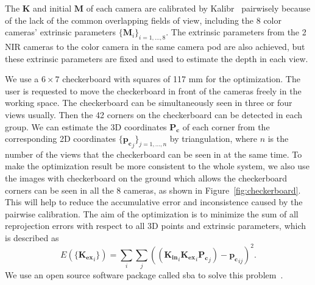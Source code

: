 The $\mathbf{K}$ and initial $\mathbf{M}$ of each camera are calibrated by Kalibr~\cite{Maye2013Self} pairwisely because of the lack of the common overlapping fields of view, including the 8 color cameras' extrinsic parameters $\{\mathbf{M}_{i}\}_{i=1,...,8}$. The extrinsic parameters from the 2 NIR cameras to the color camera in the same camera pod are also achieved, but these extrinsic parameters are fixed and used to estimate the depth in each view.


We use a $6\times7$ checkerboard with squares of 117 mm for the optimization. 
%
The user is requested to move the checkerboard in front of the cameras freely in the working space. The checkerboard can be simultaneously seen in three or four views usually. 
%
Then the 42 corners on the checkerboard can be detected in each group. 
%
We can estimate the 3D coordinates $\mathbf{P_{c}}$ of each corner from the corresponding 2D coordinates $\{\mathbf{p_{c}}_{j}\}_{j=1,...,n}$ by triangulation, where $n$ is the number of the views that the checkerboard can be seen in at the same time. 
To make the optimization result be more consistent to the whole system, we also use the images with checkerboard on the ground which allows the checkerboard corners can be seen in all the 8 cameras,  as shown in Figure~\ref{fig:checkerboard}. This will help to reduce the accumulative error and inconsistence caused by the pairwise calibration. 
The aim of the optimization is to minimize the sum of all reprojection errors with respect to all 3D points and extrinsic parameters, which is described as
\begin{equation}
E(\{\mathbf{K_{ex}}_{i}\})=\sum_{i}\sum_{j}((\mathbf{K_{in}}_{i}\mathbf{K_{ex}}_{i}\mathbf{P_{c}}_{j})-\mathbf{p_{c}}_{ij})^{2}.
\end{equation}
We use an open source software package called sba to solve this problem~\cite{lour09}.


